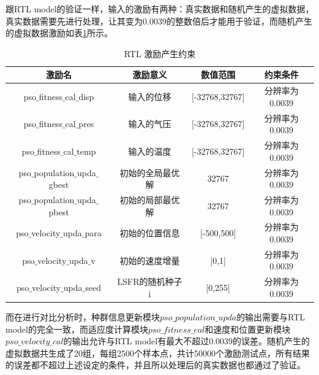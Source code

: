跟RTL model的验证一样，输入的激励有两种：真实数据和随机产生的虚拟数据，真实数据需要先进行处理，让其变为0.0039的整数倍后才能用于验证，而随机产生的虚拟数据激励如表\ref{tab:RTL激励产生约束}所示。
\begin{table}[H]
    \centering
    \caption{RTL 激励产生约束}
    \label{tab:RTL激励产生约束}
    \begin{tabular}{c|c|c|c}
        \hline
        激励名                                    & 激励意义                   &  数值范围            & 约束条件  \\ \hline
        pso$\_$fitness$\_$cal$\_$disp            & 输入的位移                  &  [-32768,32767]     & 分辨率为0.0039      \\ \hline
        pso$\_$fitness$\_$cal$\_$pres            & 输入的气压                  &  [-32768,32767]     & 分辨率为0.0039      \\ \hline
        pso$\_$fitness$\_$cal$\_$temp            & 输入的温度                  &  [-32768,32767]     & 分辨率为0.0039      \\ \hline
        pso$\_$population$\_$upda$\_$gbest       & 初始的全局最优解            &  32767              & 分辨率为0.0039       \\ \hline
        pso$\_$population$\_$upda$\_$pbest       & 初始的局部最优解            &  32767              & 分辨率为0.0039       \\ \hline
        pso$\_$velocity$\_$upda$\_$para         & 初始的位置信息               & [-500,500]          & 分辨率为0.0039      \\ \hline
        pso$\_$velocity$\_$upda$\_$v            & 初始的速度增量               & [0,1]               & 分辨率为0.0039       \\ \hline
        pso$\_$velocity$\_$upda$\_$seed         & LSFR的随机种子i              & [0,255]             & 分辨率为0.0039     \\ \hline
    \end{tabular}
  \end{table}

而在进行对比分析时，种群信息更新模块$pso\_population\_upda$的输出需要与RTL model的完全一致，而适应度计算模块$pso\_fitness\_cal$和速度和位置更新模块$pso\_velocity\_cal$的输出允许与RTL model有最大不超过0.0039的误差。随机产生的虚拟数据共生成了20组，每组2500个样本点，共计50000个激励测试点，所有结果的误差都不超过上述设定的条件，并且所以处理后的真实数据也都通过了验证。

